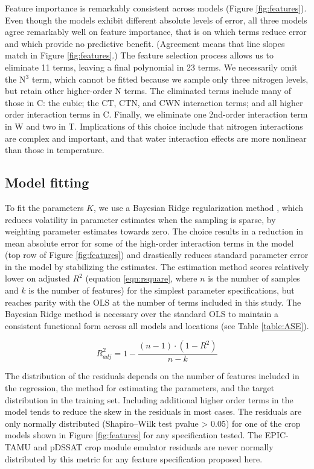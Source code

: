\documentclass[gmd, manuscript]{copernicus} %
\begin{document}
Feature importance is remarkably consistent across models (Figure \ref{fig:features}). 
Even though the models exhibit different absolute levels of error, all three models agree remarkably well on feature importance, that is on  which terms reduce error and which provide no predictive benefit. (Agreement means that line slopes match in Figure \ref{fig:features}.) 
The feature selection process allows us to eliminate 11 terms, leaving a final polynomial in 23 terms.
We necessarily omit the N$^3$ term, which cannot be fitted because we sample only three nitrogen levels, but retain other higher-order N terms. The eliminated terms include many of those in C: the cubic; the CT, CTN, and CWN interaction terms; and all higher order interaction terms in C. 
Finally, we eliminate one 2nd-order interaction term in W and two in T. 
Implications of this choice include that nitrogen interactions are complex and important, and that water interaction effects are more nonlinear than those in temperature. 

\subsection{Model fitting}
To fit the parameters $K$, we use a Bayesian Ridge regularization method \citep{MacKay91}, which reduces volatility in parameter estimates when the sampling is sparse, by weighting parameter estimates towards zero. 
The choice results in a reduction in mean absolute error for some of the high-order interaction terms in the model (top row of Figure \ref{fig:features}) and drastically reduces standard parameter error in the model by stabilizing the estimates.
The estimation method scores relatively lower on adjusted $R^2$ (equation \ref{eqn:rsquare}, where $n$ is the number of samples and $k$ is the number of features) for the simplest parameter specifications, but reaches parity with the OLS at the number of terms included in this study.
The Bayesian Ridge method is necessary over the standard OLS to maintain a consistent functional form across all models and locations (see Table \ref{table:ASE}). 

\begin{equation}
    \label{eqn:rsquare}
    R^{2}_{adj} = 1 - \frac{(n-1) \cdot (1 - R^{2})}{n - k}
\end{equation}

The distribution of the residuals depends on the number of features included in the regression, the method for estimating the parameters, and the target distribution in the training set. 
Including additional higher order terms in the model tends to reduce the skew in the residuals in most cases.
The residuals are only normally distributed (Shapiro–Wilk test \citep{Shapiro1965} pvalue > 0.05) for one of the crop models shown in Figure \ref{fig:features} for any specification tested.
The EPIC-TAMU and pDSSAT crop module emulator residuals are never normally distributed by this metric for any feature specification proposed here. 
\end{document}

